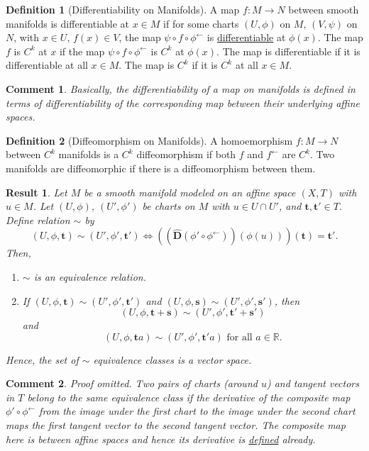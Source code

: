 \documentclass[letterpaper,12pt]{article}
\theoremstyle{plain}
\newtheorem{res}{Result}
\theoremstyle{plain}
\newtheorem*{cmnt*}{Comment}
\theoremstyle{definition}
\newtheorem{defn}{Definition}
\begin{document}
\begin{defn}[Differentiability on Manifolds]\label{defdfrblm}
A map $f:M\rightarrow N$ between smooth manifolds is differentiable at $x\in M$ if for some charts $(U,\phi)$ on $M$, $(V,\psi)$ on $N$, with $x\in U$, $f(x)\in V$, the map $\psi \circ f \circ \phi^{\leftarrow}$ is \hyperref[defdfrbla]{differentiable} at $\phi(x)$. The map $f$ is $C^k$ at $x$ if the map $\psi \circ f \circ \phi^{\leftarrow}$ is $C^k$ at $\phi(x)$. The map is differentiable if it is differentiable at all $x\in M$. The map is $C^k$ if it is $C^k$ at all $x\in M$.
\end{defn}

\begin{cmnt*}
Basically, the differentiability of a map on manifolds is defined in terms of differentiability of the corresponding map between their underlying affine spaces.
\end{cmnt*}

\begin{defn}[Diffeomorphism on Manifolds]\label{defdifm}
A homoemorphism $f:M\rightarrow N$ between $C^k$ manifolds is a $C^k$ diffeomorphism if both $f$ and $f^{\leftarrow}$ are $C^k$. Two manifolds are diffeomorphic if there is a diffeomorphism between them.
\end{defn}

\begin{res} \label{resTuM}Let $M$ be a smooth manifold  modeled on an affine space $(X,T)$ with $u\in M$. Let  $(U,\phi)$, $(U',\phi')$ be charts on $M$ with $u\in U\cap U'$, and $\mathbf{t},\mathbf{t}'\in T$. Define relation $\sim$ by
\[ (U,\phi,\mathbf{t}) \sim (U',\phi',\mathbf{t}') \iff \left(\left(\hat{\mathbf{D}}\left(\phi' \circ \phi^{\leftarrow}\right)\right)\left(\phi(u)\right)\right)(\mathbf{t}) = \mathbf{t}'. \]
Then,
\begin{enumerate}
\item $\sim$ is an equivalence relation.
\item If $(U,\phi,\mathbf{t}) \sim (U',\phi',\mathbf{t}')$ and $(U,\phi,\mathbf{s}) \sim (U',\phi',\mathbf{s}')$, then
\[ (U,\phi,\mathbf{t}+\mathbf{s}) \sim (U',\phi',\mathbf{t}'+\mathbf{s}') \]
and
\[ (U,\phi,\mathbf{t}a) \sim (U',\phi',\mathbf{t}'a) \text{ for all } a\in\mathbb{R}.\]
\end{enumerate}
Hence, the set of $\sim$ equivalence classes is a vector space.
\end{res}
\begin{cmnt*}
Proof omitted. Two pairs of charts (around $u$) and tangent vectors in $T$ belong to the same equivalence class if the derivative of the composite map $\phi' \circ \phi^{\leftarrow}$ from the image under the first chart to the image under the second chart maps the first tangent vector to the second tangent vector. The composite map here is between affine spaces and hence its derivative is \hyperref[defderivat]{defined} already. \end{cmnt*}
\end{document}
